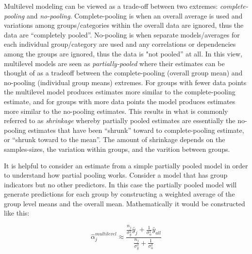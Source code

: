 Multilevel modeling can be viewed as a trade-off between two extremes: \textit{complete-pooling} and \textit{no-pooling}. Complete-pooling is when an overall average is used and variations among groups/categories within the overall data are ignored, thus the data are “completely pooled”. No-pooling is when separate models/averages for each individual group/category are used and any correlations or dependencies among the groups are ignored, thus the data is "not pooled” at all. In this view, multilevel models are seen as \textit{partially-pooled} where their estimates can be thought of as a tradeoff between the complete-pooling (overall group mean) and no-pooling (individual group means) extremes. For groups with fewer data points the multilevel model produces estimates more similar to the complete-pooling estimate, and for groups with more data points the model produces estimates more similar to the no-pooling estimates. This results in what is commonly referred to as \textit{shrinkage} whereby partially pooled estimates are essentially the no-pooling estimates that have been “shrunk” toward to complete-pooling estimate, or “shrunk toward to the mean”. The amount of shrinkage depends on the samples-sizes, the variation within groups, and the varition between groups.

It is helpful to consider an estimate from a simple partially pooled model in order to understand how partial pooling works. Consider a model that has group indicators but no other predictors. In this case the partially pooled model will generate predictions for each group by constructing a weighted average of the group level means and the overall mean. Mathematically it would be constructed like this:

\begin{equation}
\hat{\alpha}_j^{multilevel} \approx \frac{ \frac{n_j}{\sigma_y^2} \bar{y}_j + \frac{1}{\sigma_{\alpha}^2} \bar{y}_{all} }{ \frac{n_j}{\sigma_y^2} + \frac{1}{\sigma_{\alpha}^2} }
\end{equation}

